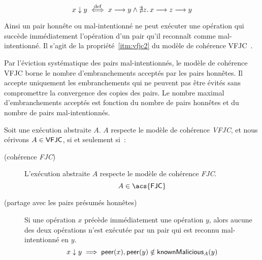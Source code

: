 \begin{equation*}
    x \downarrow y \overset{\mathrm{def}}{\iff} x \longrightarrow y \land \nexists z \ldotp x \longrightarrow z \longrightarrow y
\end{equation*}

Ainsi un pair honnête ou mal-intentionné ne peut exécuter une opération qui succède immédiatement l'opération d'un pair qu'il reconnaît comme mal-intentionné.
Il s'agit de la propriété~\ref{itm:vfjc2} du modèle de cohérence \acf{VFJC}~\autocite{mahajan_2011_cac}.

Par l'éviction systématique des pairs mal-intentionnés, le modèle de cohérence \ac{VFJC} borne le nombre d'embranchements acceptés par les pairs honnêtes.
Il accepte uniquement les embranchements qui ne peuvent pas être évités sans compromettre la convergence des copies des pairs.
Le nombre maximal d'embranchements acceptés est fonction du nombre de pairs honnêtes et du nombre de pairs mal-intentionnés.

\begin{definition}\label{def:vfjc-consistency}
  Soit une exécution abstraite $A$. $A$ respecte le modèle de cohérence \emph{\acf{VFJC}}, et nous cérivons $A \in \operatorname{\mathsf{VFJC}}$, si et seulement si~:

  \begin{description}
  \item[ (cohérence \emph{\acl{FJC}})]
  L'exécution abstraite $A$ respecte le modèle de cohérence \emph{\ac{FJC}}.
  \begin{equation*}
    A \in \trm{\acs{FJC}}
  \end{equation*}

  \item[ (partage avec les pairs présumés honnêtes)]
  Si une opération $x$ précède immédiatement une opération $y$, alors aucune des deux opérations n'est exécutée par un pair qui est reconnu mal-intentionné en $y$.
  \begin{equation*}
    x \downarrow y \implies \operatorname{\mathsf{peer}}(x), \operatorname{\mathsf{peer}}(y) \notin \operatorname{\mathsf{knownMalicious}}_A(y)
  \end{equation*}
  \end{description}
\end{definition}

